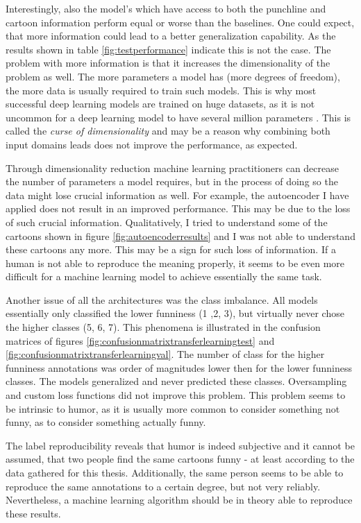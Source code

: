 \documentclass[draft,final,oneside]{vutinfth} %
\begin{document}
Interestingly, also the model's which have access to both the punchline and cartoon information perform equal or worse than the baselines. One could expect, that more information could lead to a better generalization capability. As the results shown in table \ref{fig:testperformance} indicate this is not the case. The problem with more information is that it increases the dimensionality of the problem as well. The more parameters a model has (more degrees of freedom), the more data is usually required to train such models. This is why most successful deep learning models are trained on huge datasets, as it is not uncommon for a deep learning model to have several million parameters \cite{nmt}\cite{resnet}. This is called the \textit{curse of dimensionality} \cite{Goodfellow-et-al-2016} and may be a reason why combining both input domains leads does not improve the performance, as expected.

Through dimensionality reduction machine learning practitioners can decrease the number of parameters a model requires, but in the process of doing so the data might lose crucial information as well. For example, the autoencoder I have applied does not result in an improved performance. This may be due to the loss of such crucial information. Qualitatively, I tried to understand some of the cartoons shown in figure \ref{fig:autoencoderresults} and I was not able to understand these cartoons any more. This may be a sign for such loss of information. If a human is not able to reproduce the meaning properly, it seems to be even more difficult for a machine learning model to achieve essentially the same task.

Another issue of all the architectures was the class imbalance. All models essentially only classified the lower funniness (1 ,2, 3), but virtually never chose the higher classes (5, 6, 7). This phenomena is illustrated in the confusion matrices of figures \ref{fig:confusionmatrixtransferlearningtest} and \ref{fig:confusionmatrixtransferlearningval}. The number of class for the higher funniness annotations was order of magnitudes lower then for the lower funniness classes. The models generalized and never predicted these classes. Oversampling and custom loss functions did not improve this problem. This problem seems to be intrinsic to humor, as it is usually more common to consider something not funny, as to consider something actually funny.

The label reproducibility reveals that humor is indeed subjective and it cannot be assumed, that two people find the same cartoons funny - at least according to the data gathered for this thesis. Additionally, the same person seems to be able to reproduce the same annotations to a certain degree, but not very reliably. Nevertheless, a machine learning algorithm should be in theory able to reproduce these results.
\end{document}
